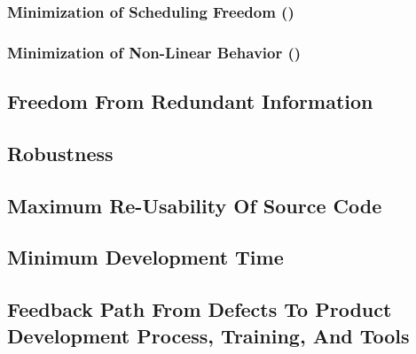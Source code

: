 \subsubsection[Minimization of Scheduling Freedom]
              {Minimization of Scheduling Freedom 
              ()}
\label{chgr0:sdda0:mpc0:msf0}


\subsubsection[Minimization of Non-Linear Behavior]
              {Minimization of Non-Linear Behavior
              ()}
\label{chgr0:sdda0:mpc0:mnl0}


\subsection{Freedom From Redundant Information}


\subsection{Robustness}
\label{chgr0:sdda0:srob0}


\subsection{Maximum Re-Usability Of Source Code}


\subsection{Minimum Development Time}


\subsection{Feedback Path From Defects To Product Development Process, Training, And Tools}








